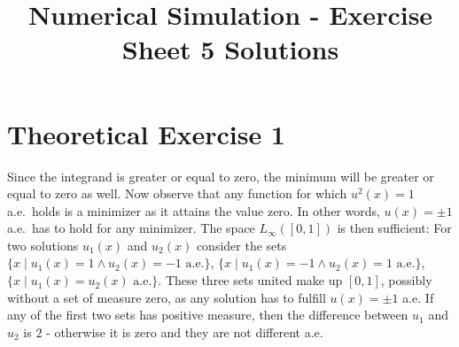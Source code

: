 \documentclass[a4paper, oneside, USenglish]{amsart}
\begin{document}
\title{Numerical Simulation - Exercise Sheet 5 Solutions}
\maketitle{}
\section*{Theoretical Exercise 1}
Since the integrand is greater or equal to zero, the minimum will be greater or equal to zero as well. Now observe that any function for which $u^2(x) = 1$ a.e.\ holds is a minimizer as it attains the value zero. In other words, $u(x) = \pm 1$ a.e.\ has to hold for any minimizer. The space $L_\infty([0, 1])$ is then sufficient: For two solutions $u_1(x)$ and $u_2(x)$ consider the sets $\{ x \mid u_1(x) = 1 \wedge u_2(x) = -1 \text{ a.e.}\}$, $\{ x \mid u_1(x) = -1 \wedge u_2(x) = 1 \text{ a.e.}\}$, $\{ x \mid u_1(x) = u_2(x) \text{ a.e.}\}$. These three sets united make up $[0,1]$, possibly without a set of measure zero, as any solution has to fulfill $u(x) = \pm 1$ a.e. If any of the first two sets has positive measure, then the difference between $u_1$ and $u_2$ is $2$ - otherwise it is zero and they are not different a.e.
\end{document}
